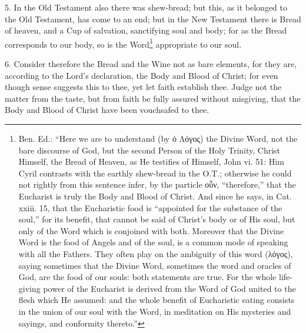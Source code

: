 5. In the Old Testament also there was shew-bread; but this, as it belonged to the Old Testament, has come to an end; but in the New Testament there is Bread of heaven, and a Cup of salvation, sanctifying soul and body; for as the Bread corresponds to our body, so is the Word\footnote{Ben. Ed.: “Here we are to understand (by \textgreek{ὁ Λόγος}) the Divine Word, not the bare discourse of God, but the second Person of the Holy Trinity, Christ Himself, the Bread of Heaven, as He testifies of Himself, John vi. 51: Him Cyril contrasts with the earthly shew-bread in the O.T.; otherwise he could not rightly from this sentence infer, by the particle \textgreek{οὖν}, “therefore,” that the Eucharist is truly the Body and Blood of Christ. And since he says, in Cat. xxiii. 15, that the Eucharistic food is “appointed for the substance of the soul,” for its benefit, that cannot be said of Christ’s body or of His soul, but only of the Word which is conjoined with both. Moreover that the Divine Word is the food of Angels and of the soul, is a common mode of speaking with all the Fathers. They often play on the ambiguity of this word (\textgreek{λόγος}), saying sometimes that the Divine Word, sometimes the word and oracles of God, are the food of our souls: both statements are true. For the whole life-giving power of the Eucharist is derived from the Word of God united to the flesh which He assumed: and the whole benefit of Eucharistic eating consists in the union of our soul with the Word, in meditation on His mysteries and sayings, and conformity thereto.”} appropriate to our soul.

6. Consider therefore the Bread and the Wine not as bare elements, for they are, according to the Lord’s declaration, the Body and Blood of Christ; for even though sense suggests this to thee, yet let faith establish thee. Judge not the matter from the taste, but from faith be fully assured without misgiving, that the Body and Blood of Christ have been vouchsafed to thee.

